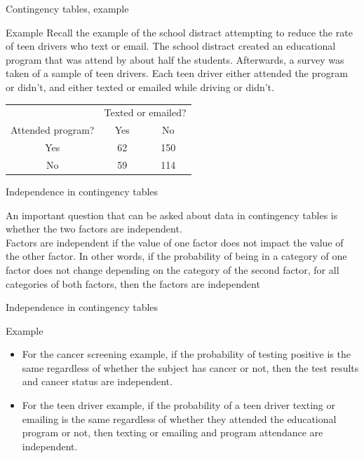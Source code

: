 \documentclass[xcolor=table, aspectratio=169, bigger]{beamer}
\begin{document}
\begin{frame}{Contingency tables, example}
\begin{exampleblock}{Example}
Recall the example of the school distract attempting to reduce the rate of teen drivers who text or email. The school distract created an educational program that was attend by about half the students. Afterwards, a survey was taken of a sample of teen drivers. Each teen driver either attended the program or didn't, and either texted or emailed while driving or didn't.\\
\medskip
{\centering
\begin{tabular}{c | c  c}
\multicolumn{1}{c}{} & \multicolumn{2}{c}{Texted or emailed?}\\
Attended program? & Yes & No\\
\hline
Yes & 62 & 150\\
No & 59 & 114 \\
\end{tabular}
\par}
\smallskip

\end{exampleblock}
\end{frame}


\begin{frame}{Independence in contingency tables}
\begin{block}{}
An important question that can be asked about data in contingency tables is whether the two factors are independent.\\
\pause\medskip
Factors are independent if the value of one factor does not impact the value of the other factor. In other words, if the probability of being in a category of one factor does not change depending on the category of the second factor, for all categories of both factors, then the factors are independent 
\end{block}
\end{frame}

\begin{frame}{Independence in contingency tables}
\begin{exampleblock}{Example}
\begin{itemize}
\item For the cancer screening example, if the probability of testing positive is the same regardless of whether the subject has cancer or not, then the test results and cancer status are independent.

\pause\item For the teen driver example, if the probability of a teen driver texting or emailing is the same regardless of whether they attended the educational program or not, then texting or emailing and program attendance are independent.
\end{itemize}
\end{exampleblock}
\end{frame}
\end{document}
